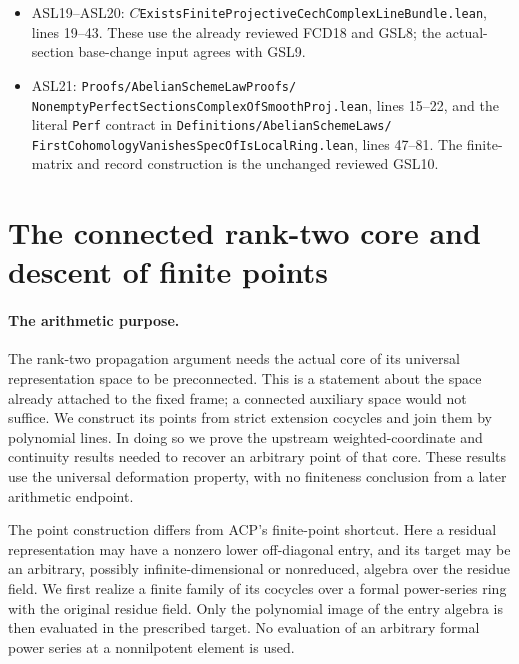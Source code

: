 \documentclass[11pt,a4paper]{article}
\numberwithin{equation}{section}
\theoremstyle{remark}\newtheorem{remark}[theorem]{Remark}
\begin{document}
\begin{itemize}
\item ASL19--ASL20:
$C$\texttt{Exists\allowbreak{}Finite\allowbreak{}Projective\allowbreak{}Cech\allowbreak{}Complex\allowbreak{}Line\allowbreak{}Bundle.lean},
lines 19--43.  These use the already reviewed FCD18 and GSL8;
the actual-section base-change input agrees with GSL9.
\item ASL21:
\texttt{Proofs/\allowbreak{}Abelian\allowbreak{}Scheme\allowbreak{}Law\allowbreak{}Proofs/\allowbreak{}}
\texttt{Nonempty\allowbreak{}Perfect\allowbreak{}Sections\allowbreak{}Complex\allowbreak{}Of\allowbreak{}Smooth\allowbreak{}Proj.lean},
lines 15--22, and the literal \texttt{Perf} contract in
\texttt{Definitions/\allowbreak{}Abelian\allowbreak{}Scheme\allowbreak{}Laws/\allowbreak{}}
\texttt{First\allowbreak{}Cohomology\allowbreak{}Vanishes\allowbreak{}Spec\allowbreak{}Of\allowbreak{}Is\allowbreak{}Local\allowbreak{}Ring.lean},
lines 47--81.  The finite-matrix and record construction is
the unchanged reviewed GSL10.
\end{itemize}


\section{The connected rank-two core and descent of finite points}
\label{sec:rank-two-connectedness}

\paragraph{The arithmetic purpose.}
The rank-two propagation argument needs the actual core of its universal
representation space to be preconnected.  This is a statement about
the space already attached to the fixed frame; a connected auxiliary
space would not suffice.  We construct its points from strict extension
cocycles and join them by polynomial lines.  In doing so we prove the
upstream weighted-coordinate and continuity results needed to recover
an arbitrary point of that core.  These results use the universal
deformation property, with no finiteness conclusion from a later
arithmetic endpoint.

The point construction differs from ACP's finite-point shortcut.
Here a residual representation may have a nonzero lower off-diagonal
entry, and its target may be an arbitrary, possibly infinite-dimensional
or nonreduced, algebra over the residue field.  We first realize a
finite family of its cocycles over a formal power-series ring with the
original residue field.  Only the polynomial image of the entry algebra
is then evaluated in the prescribed target.  No evaluation of an
arbitrary formal power series at a nonnilpotent element is used.
\end{document}
